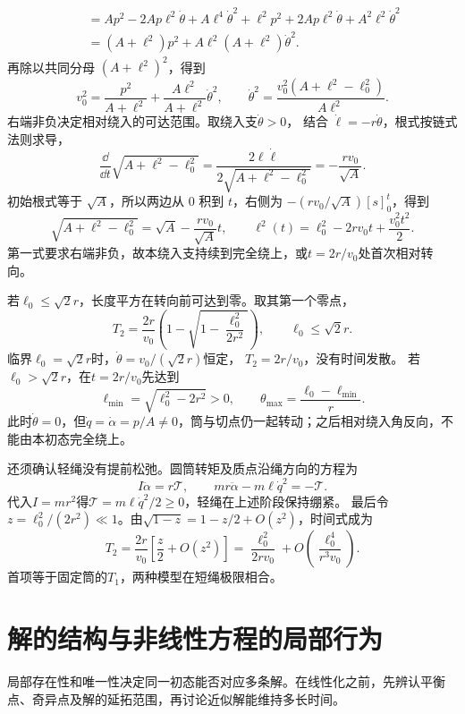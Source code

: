 \begin{solution}
\[\begin{aligned}
&\quad=Ap^2-2Ap\ell^2\dot\theta+A\ell^4\dot\theta^2
+\ell^2p^2+2Ap\ell^2\dot\theta+A^2\ell^2\dot\theta^2\\
&\quad=(A+\ell^2)p^2+A\ell^2(A+\ell^2)\dot\theta^2.
\end{aligned}
\]
再除以共同分母 $(A+\ell^2)^2$，得到
\[
 v_0^2=\frac{p^2}{A+\ell^2}
 +\frac{A\ell^2}{A+\ell^2}\dot\theta^2,\qquad
 \boxed{\dot\theta^2=
 \frac{v_0^2(A+\ell^2-\ell_0^2)}{A\ell^2}}.
\]
右端非负决定相对绕入的可达范围。取绕入支$\dot\theta>0$，
结合 $\dot\ell=-r\dot\theta$，根式按链式法则求导，
\[
 \frac{\dd}{\dd t}\sqrt{A+\ell^2-\ell_0^2}
 =\frac{2\ell\dot\ell}{2\sqrt{A+\ell^2-\ell_0^2}}
 =-\frac{rv_0}{\sqrt A}.
\]
初始根式等于 $\sqrt A$，所以两边从 $0$ 积到 $t$，右侧为 $-(rv_0/\sqrt A)[s]_0^t$，得到
\[
 \sqrt{A+\ell^2-\ell_0^2}
 =\sqrt A-\frac{rv_0}{\sqrt A}t,\qquad
 \boxed{\ell^2(t)=\ell_0^2-2rv_0t+\frac{v_0^2t^2}{2}}.
\]
第一式要求右端非负，故本绕入支持续到完全绕上，或$t=2r/v_0$处首次相对转向。

若$\ell_0\le\sqrt2r$，长度平方在转向前可达到零。取其第一个零点，
\[
 \boxed{T_2=\frac{2r}{v_0}
 \left(1-\sqrt{1-\frac{\ell_0^2}{2r^2}}\right)},
 \qquad \ell_0\le\sqrt2r.
\]
临界$\ell_0=\sqrt2r$时，$\dot\theta=v_0/(\sqrt2r)$恒定，
$T_2=2r/v_0$，没有时间发散。
若$\ell_0>\sqrt2r$，在$t=2r/v_0$先达到
\[
 \ell_{\min}=\sqrt{\ell_0^2-2r^2}>0,\qquad
 \theta_{\max}=\frac{\ell_0-\ell_{\min}}r.
\]
此时$\dot\theta=0$，但$\dot q=\dot\alpha=p/A\ne0$，筒与切点仍一起转动；之后相对绕入角反向，不能由本初态完全绕上。

还须确认轻绳没有提前松弛。圆筒转矩及质点沿绳方向的方程为
\[
 I\ddot\alpha=r\mathcal T,\qquad
 mr\ddot\alpha-m\ell\dot q^2=-\mathcal T.
\]
代入$I=mr^2$得$\mathcal T=m\ell\dot q^2/2\ge0$，轻绳在上述阶段保持绷紧。
最后令$z=\ell_0^2/(2r^2)\ll1$。由$\sqrt{1-z}=1-z/2+O(z^2)$，时间式成为
\[
 T_2=\frac{2r}{v_0}\left[\frac z2+O(z^2)\right]
 =\frac{\ell_0^2}{2rv_0}
 +O\!\left(\frac{\ell_0^4}{r^3v_0}\right).
\]
首项等于固定筒的$T_1$，两种模型在短绳极限相合。
\end{solution}


\section{解的结构与非线性方程的局部行为}
局部存在性和唯一性决定同一初态能否对应多条解。在线性化之前，先辨认平衡点、奇异点及解的延拓范围，再讨论近似解能维持多长时间。


